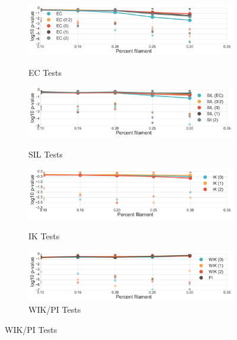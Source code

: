 \documentclass[12pt]{article}
\begin{document}
\begin{center}
  \begin{figure}[htp!]
    \centering
    \begin{subfigure}{.5\textwidth}
      \centering
      \caption{EC Tests}
      \includegraphics[width=\linewidth]{figure_8_euler_group_normed.pdf}
      \label{fig:sub_euler}
    \end{subfigure}
    \begin{subfigure}{.5\textwidth}
      \centering
      \caption{SIL Tests}
      \includegraphics[width=\linewidth]{figure_8_silhouette_group_normed.pdf}
      \label{fig:sub_silh}
    \end{subfigure}
    \begin{subfigure}{.5\textwidth}
      \centering
      \caption{IK Tests}
      \includegraphics[width=\linewidth]{figure_8_contour_group_normed.pdf}
      \label{fig:sub_contour}
    \end{subfigure}
    \begin{subfigure}{.5\textwidth}
      \centering
      \caption{WIK/PI Tests}
      \includegraphics[width=\linewidth]{figure_8_weighted_contour_group_normed.pdf}

\end{subfigure}
\end{figure}
\end{center}
\end{document}
